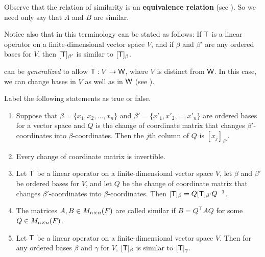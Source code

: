 \begin{remark} \label{remark 2.5.3}
Observe that the relation of similarity is an \textbf{equivalence relation} (see ).
So we need only say that \(A\) and \(B\) are similar.

Notice also that in this terminology  can be stated as follows:
If \(\textsf{T}\) is a linear operator on a finite-dimensional vector space \(V\), and if \(\beta\) and \(\beta'\) are any ordered bases for \(V\), then \([\textsf{T}]_{\beta'}\) is similar to \([\textsf{T}]_{\beta}\).
\end{remark}

\begin{remark} \label{remark 2.5.4}
 can be \emph{generalized} to allow \(\textsf{T} : V \to \textsf{W}\), where \(V\) is distinct from \(\textsf{W}\).
In this case, we can change bases in \(V\) as well as in \(\textsf{W}\) (see ).
\end{remark}

\exercisesection

\begin{exercise} \label{exercise 2.5.1}
Label the following statements as true or false.
\begin{enumerate}
\item Suppose that \(\beta = \{ x_1, x_2, ..., x_n \}\) and \(\beta' = \{ x'_1, x'_2, ..., x'_n \}\) are ordered bases for a vector space
and \(Q\) is the change of coordinate matrix that changes \(\beta'\)-coordinates into \(\beta\)-coordinates.
Then the \(j\)th column of \(Q\) is \([x_j]_{\beta'}\).

\item Every change of coordinate matrix is invertible. 

\item Let \(\textsf{T}\) be a linear operator on a finite-dimensional vector space \(V\), let \(\beta\) and \(\beta'\) be ordered bases for \(V\),
and let \(Q\) be the change of coordinate matrix that changes \(\beta'\)-coordinates into \(\beta\)-coordinates.
Then \([\textsf{T}]_{\beta} = Q [\textsf{T}]_{\beta'} Q^{-1}\).

\item The matrices \(A, B \in M_{n \times n}(F)\) are called similar if \(B = Q^\top A Q\) for some \(Q \in M_{n \times n}(F)\).

\item Let \(\textsf{T}\) be a linear operator on a finite-dimensional vector space \(V\).
Then for any ordered bases \(\beta\) and \(\gamma\) for \(V\), \([\textsf{T}]_{\beta}\) is similar to \([\textsf{T}]_{\gamma}\).
\end{enumerate}
\end{exercise}

